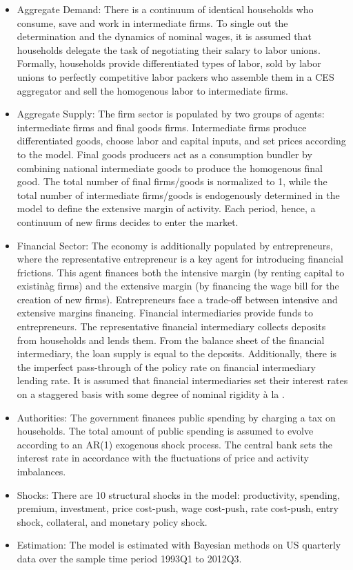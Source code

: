 \documentclass[11pt,a4paper]{article}
\begin{document}
	\begin{itemize}
		
		\item Aggregate Demand: There is a continuum of identical households who consume, save and work in intermediate firms. To single out the determination and the dynamics of nominal wages, it is assumed that households delegate the task of negotiating their salary to labor unions. Formally, households provide differentiated types of labor, sold by labor unions to perfectly competitive labor packers who assemble them in a CES aggregator and sell the homogenous labor to intermediate firms.
		
		\item Aggregate Supply: The firm sector is populated by two groups of agents: intermediate firms and final goods firms. Intermediate firms produce differentiated goods, choose labor and capital inputs, and set prices according to the \cite{Rotemberg1982} model. Final goods producers act as a consumption bundler by combining national intermediate goods to produce the homogenous final good. The total number of final firms/goods is normalized to 1, while the total number of intermediate firms/goods is endogenously determined in the model to define the extensive margin of activity. Each period, hence, a continuum of new firms decides to enter the market.
		
		\item Financial Sector: The economy is additionally populated by entrepreneurs, where the representative entrepreneur is a key agent for introducing financial frictions. This agent finances both the intensive margin (by renting capital to existin\`{a}g firms) and the extensive margin (by financing the wage bill for the creation of new firms). Entrepreneurs face a trade-off between intensive and extensive margins financing. Financial intermediaries provide funds to entrepreneurs. The representative financial intermediary collects deposits from households and lends them. From the balance sheet of the financial intermediary, the loan supply is equal to the deposits. Additionally, there is the imperfect pass-through of the policy rate on financial intermediary lending rate. It is assumed that financial intermediaries set their interest rates on a staggered basis with some degree of nominal rigidity \`{a} la \cite{Rotemberg1982}.
		
		\item Authorities: The government finances public spending by charging a tax on households. The total amount of public spending is assumed to evolve according to an AR(1) exogenous shock process. The central bank sets the interest rate in accordance with the fluctuations of price and activity imbalances.
		
		\item Shocks: There are 10 structural shocks in the model: productivity, spending, premium, investment, price cost-push, wage cost-push, rate cost-push, entry shock, collateral, and monetary policy shock.
		
		\item Estimation: The model is estimated with Bayesian methods on US quarterly data over the sample time period 1993Q1 to 2012Q3.
	\end{itemize}
	
\end{document}
